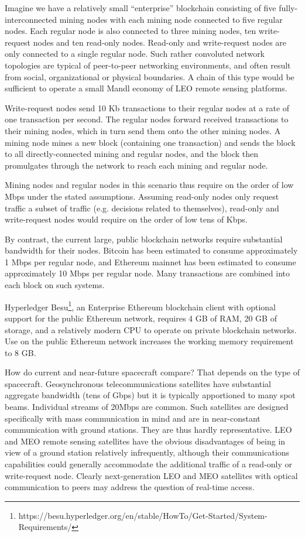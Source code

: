 \documentclass[journal ]{new-aiaa}
\begin{document}
Imagine we have a relatively small ``enterprise'' blockchain consisting of five fully-interconnected mining nodes with each mining node connected to five regular nodes. Each regular node is also connected to three mining nodes, ten write-request nodes and ten read-only nodes. Read-only and write-request nodes are only connected to a single regular node. Such rather convoluted network topologies are typical of peer-to-peer networking environments, and often result from social, organizational or physical boundaries. A chain of this type would be sufficient to operate a small Mandl economy of LEO remote sensing platforms.

Write-request nodes send 10 Kb transactions to their regular nodes at a rate of one transaction per second. The regular nodes forward received transactions to their mining nodes, which in turn send them onto the other mining nodes. A mining node mines a new block (containing one transaction) and sends the block to all directly-connected mining and regular nodes, and the block then promulgates through the network to reach each mining and regular node.

Mining nodes and regular nodes in this scenario thus require on the order of low Mbps under the stated assumptions. Assuming read-only nodes only request traffic a subset of traffic (e.g. decisions related to themselves), read-only and write-request nodes would require on the order of low tens of Kbps.

By contrast, the current large, public blockchain networks require substantial bandwidth for their nodes. Bitcoin has been estimated to consume approximately 1 Mbps per regular node, and Ethereum mainnet has been estimated to consume approximately 10 Mbps per regular node. Many transactions are combined into each block on such systems.

Hyperledger Besu\footnote{https://besu.hyperledger.org/en/stable/HowTo/Get-Started/System-Requirements/}, an Enterprise Ethereum blockchain client with optional support for the public Ethereum network, requires 4 GB of RAM, 20 GB of storage, and a relatively modern CPU to operate on private blockchain networks. Use on the public Ethereum network increases the working memory requirement to 8 GB.

How do current and near-future spacecraft compare? That depends on the type of spacecraft. Geosynchronous telecommunications satellites have substantial aggregate bandwidth (tens of Gbps) but it is typically apportioned to many spot beams. Individual streams of 20Mbps are common. Such satellites are designed specifically with mass communication in mind and are in near-constant communication with ground stations. They are thus hardly representative. LEO and MEO remote sensing satellites have the obvious disadvantages of being in view of a ground station relatively infrequently, although their communications capabilities could generally accommodate the additional traffic of a read-only or write-request node. Clearly next-generation LEO and MEO satellites with optical communication to peers may address the question of real-time access.
\end{document}
